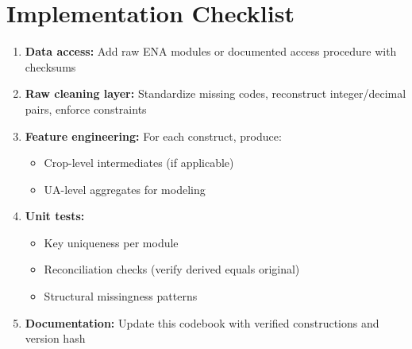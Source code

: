 \documentclass[11pt,a4paper]{article}
\begin{document}
\section{Implementation Checklist}

\begin{enumerate}[leftmargin=1.5em]
    \item \textbf{Data access:} Add raw ENA modules or documented access procedure with checksums
    
    \item \textbf{Raw cleaning layer:} Standardize missing codes, reconstruct integer/decimal pairs, enforce constraints
    
    \item \textbf{Feature engineering:} For each construct, produce:
    \begin{itemize}
        \item Crop-level intermediates (if applicable)
        \item UA-level aggregates for modeling
    \end{itemize}
    
    \item \textbf{Unit tests:}
    \begin{itemize}
        \item Key uniqueness per module
        \item Reconciliation checks (verify derived equals original)
        \item Structural missingness patterns
    \end{itemize}
    
    \item \textbf{Documentation:} Update this codebook with verified constructions and version hash
\end{enumerate}

\end{document}
